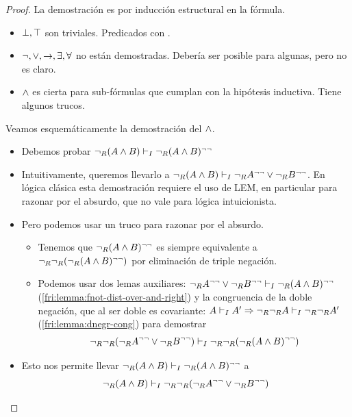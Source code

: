 \begin{proof}
    La demostración es por inducción estructural en la fórmula.
    \begin{itemize}
        \item $\bot, \top$ son triviales. Predicados con .
        \item $\neg, \vee, \to, \exists, \forall$ no están demostradas. Debería ser posible para algunas, pero no es claro.
        \item $\wedge$ es cierta para sub-fórmulas que cumplan con la hipótesis inductiva. Tiene algunos trucos.
    \end{itemize}

    Veamos esquemáticamente la demostración del $\wedge$.
    \begin{itemize}
        \item Debemos probar $\neg_R (A \wedge B) \vdash_I \neg_R (A \wedge B)^{\neg\neg}$
        \item Intuitivamente, queremos llevarlo a $\neg_R (A \wedge B) \vdash_I \neg_R A^{\neg\neg} \vee \neg_R B^{\neg\neg}$. En lógica clásica esta demostración requiere el uso de LEM, en particular   para razonar por el absurdo, que no vale para lógica intuicionista.
        \item Pero podemos usar un truco para razonar por el absurdo.
        \begin{itemize}
        \item Tenemos que $\neg_R (A \wedge B)^{\neg\neg}$ es siempre equivalente a $\neg_R \neg_R (\neg_R (A \wedge B)^{\neg\neg})$ por eliminación de triple negación.
        \item Podemos usar dos lemas auxiliares: $\neg_R A^{\neg\neg} \vee \neg_R B^{\neg\neg} \vdash_I \neg_R (A \wedge B)^{\neg\neg}$ (\ref{fri:lemma:fnot-dist-over-and-right}) y la congruencia de la doble negación, que al ser doble es covariante: $A \vdash_I A' \Rightarrow \neg_R \neg_R A \vdash_I \neg_R \neg_R A'$ (\ref{fri:lemma:dnegr-cong}) para demostrar 
        \[
            \neg_R \neg_R (\neg_R A^{\neg\neg} \vee \neg_R B^{\neg\neg})
            \vdash_I
            \neg_R \neg_R (\neg_R (A \wedge B)^{\neg\neg})
        \]
        \end{itemize}
        \item Esto nos permite llevar $\neg_R (A \wedge B) \vdash_I \neg_R (A \wedge B)^{\neg\neg}$ a \[\neg_R (A \wedge B) \vdash_I \neg_R \neg_R (\neg_R A^{\neg\neg} \vee \neg_R B^{\neg\neg})\]
        

\end{itemize}
\end{proof}
